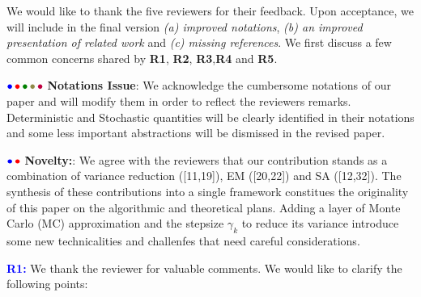 \documentclass{article}
\begin{document}
We would like to thank the five reviewers for their feedback. Upon acceptance, we will include in the final version \emph{{\sf (a)} improved notations}, \emph{{\sf (b)} an improved presentation of related work} and \emph{{\sf (c)} missing references}. 
We first discuss a few common concerns shared by \textbf{\color{blue}R1}, \textbf{\color{red} R2}, \textbf{\color{green!50!black}R3},\textbf{\color{yellow!50!black}R4} and \textbf{\color{purple}R5}.

${\color{blue}\bullet}\!~{\color{red}\bullet}\!~{\color{green!50!black}\bullet}\!~{\color{yellow!50!black}\bullet}\!~{\color{purple}\bullet}$ \textbf{Notations Issue}: 
We acknowledge the cumbersome notations of our paper and will modify them in order to reflect the reviewers remarks. 
Deterministic and Stochastic quantities will be clearly identified in their notations and some less important abstractions will be dismissed in the revised paper.


${\color{blue}\bullet}\!~{\color{red}\bullet}$ \textbf{Novelty:}: 
We agree with the reviewers that our contribution stands as a combination of variance reduction ([11,19]), EM ([20,22]) and SA ([12,32]). 
The synthesis of these contributions into a single framework constitues the originality of this paper on the algorithmic and theoretical plans.
Adding a layer of Monte Carlo (MC) approximation and the stepsize $\gamma_k$ to reduce its variance introduce some new technicalities and challenfes that need careful considerations.\vspace{-0.05in}





\textbf{\textcolor{blue}{R1:}} We thank the reviewer for valuable comments. We would like to clarify the following points:\vspace{-0.05in}

\end{document}
